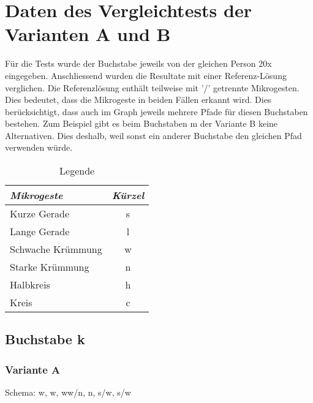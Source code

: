 \chapter{Daten des Vergleichtests der Varianten A und B}
\label{anhang_vergleich}
Für die Tests wurde der Buchstabe jeweils von der gleichen Person 20x eingegeben. Anschliessend wurden die Resultate mit einer Referenz-Lösung verglichen. Die Referenzlösung enthält teilweise mit '/' getrennte Mikrogesten. Dies bedeutet, dass die Mikrogeste in beiden Fällen erkannt wird. Dies berücksichtigt, dass auch im Graph jeweils mehrere Pfade für diesen Buchstaben bestehen. Zum Beispiel gibt es beim Buchstaben m der Variante B keine Alternativen. Dies deshalb, weil sonst ein anderer Buchstabe den gleichen Pfad verwenden würde.

\begin{table}[!h]
  \begin{center}
    \begin{tabular}{ l | c }
\emph{Mikrogeste} & \emph{Kürzel} \\ \hline
Kurze Gerade & s \\ \hline
Lange Gerade & l \\ \hline
Schwache Krümmung & w \\ \hline
Starke Krümmung & n \\ \hline
Halbkreis & h \\ \hline
Kreis & c \\ \hline

    \end{tabular}
  \end{center}
  \caption{Legende}
  \label{test_legende}
\end{table}

\section{Buchstabe k}
\subsection{Variante A}
Schema: w, w, ww/n, n, s/w, s/w

